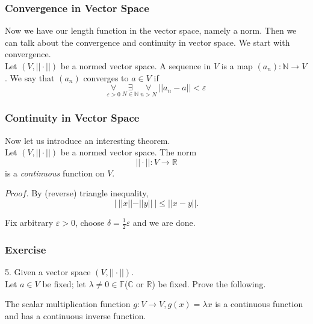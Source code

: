 \documentclass{beamer}
\begin{document}
\begin{frame}
    \frametitle{Convergence in Vector Space}
    Now we have our length function in the vector space, namely a norm. Then we can talk about the convergence and continuity in vector space. We start with convergence.\\
    \vspace{1em}
    \hspace{1em}
    Let $(V,||\cdot||)$ be a normed vector space. A sequence in $V$ is a map $(a_n):\mathbb{N}\rightarrow V$. We say that $(a_n)$ converges to $a\in V$ if
    \begin{equation*}
        \underset{\varepsilon>0}{\forall}\ \underset{N\in\mathbb{N}}{\exists}\ \underset{n>N}{\forall}\ ||a_n-a||<\varepsilon
    \end{equation*}

\end{frame}

\begin{frame}
    \frametitle{Continuity in Vector Space}
    Now let us introduce an interesting theorem. \\
    \vspace{1em}
    \hspace{1em}
    Let $(V,||\cdot||)$ be a normed vector space. The norm
    \begin{equation*}
        ||\cdot||:V\rightarrow \mathbb{R}
    \end{equation*}
    is a \emph{continuous} function on $V$.

    \vspace{1em}
    $Proof.$ \hspace{1em}
    By (reverse) triangle inequality,
    \begin{equation*}
        |\ ||x||-||y||\ |\leq ||x-y||.
    \end{equation*}

    Fix arbitrary $\varepsilon>0$, choose $\delta=\frac{1}{2}\varepsilon$ and we are done.
\end{frame}
\begin{frame}
    \frametitle{Exercise}
    5. Given a vector space $(V,||\cdot||)$.\\
    Let $a\in V$ be fixed; let $\lambda\neq 0\in \mathbb{F}$($\mathbb{C}$ or $\mathbb{R}$) be fixed. Prove the following.

    The scalar multiplication function $g:V\rightarrow V, g(x)=\lambda x$ is a continuous function and has a continuous inverse function.

\end{frame}
\end{document}
